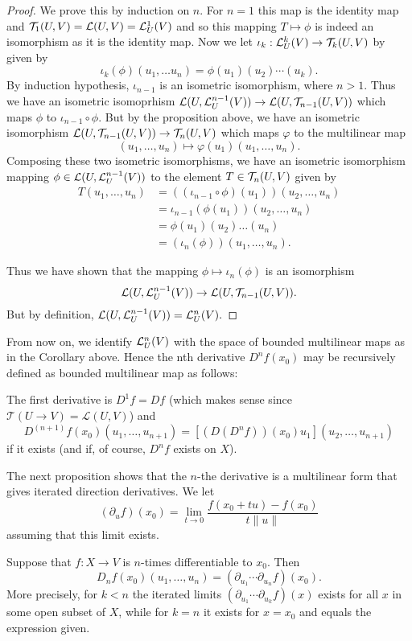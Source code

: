 \documentclass[twoside, a4paper, 10pt]{amsart}
\begin{document}
\begin{proof} We prove this by induction on $n$. For $n=1$ this map is the identity map and $\mathcal{T}_1(U,V) = \mathcal{L}(U,V) = \mathcal{L}^1_U(V)$ and so this mapping $T \mapsto \phi$ is indeed an isomorphism as it is the identity map. Now we let $\iota_k:\mathcal{L}^k_U(V) \to \mathcal{T}_k(U,V)$ by given by $$\iota_k(\phi)(u_1, \ldots u_n) = \phi(u_1)(u_2) \cdots (u_k).$$ By induction hypothesis, $\iota_{n-1}$ is an isometric isomorphism, where $n>1$.  Thus we have an isometric isomoprhism $\mathcal{L}(U, \mathcal{L}^{n-1}_U(V)) \to \mathcal{L}(U, \mathcal{T}_{n-1}(U,V))$ which maps $\phi$ to $\iota_{n-1} \circ \phi$. But by the proposition above, we have an isometric isomorphism $\mathcal{L}(U, \mathcal{T}_{n-1}(U,V)) \to \mathcal{T}_{n}(U,V)$ which maps $\varphi$ to the multilinear map $$(u_1, \ldots, u_n) \mapsto \varphi(u_1)(u_1, \ldots, u_n).$$ Composing these two isometric isomorphisms, we have an isometric isomorphism mapping $\phi \in \mathcal{L}(U, \mathcal{L}^{n-1}_U(V))$ to the element $T \in \mathcal{T}_{n}(U,V)$ given by 
\begin{align*} T(u_1, \ldots, u_n) &= ((\iota_{n-1} \circ \phi)(u_1))(u_2, \ldots, u_n) \\ 
&= \iota_{n-1}(\phi(u_1))(u_2, \ldots, u_n) \\
&= \phi(u_1)(u_2) \ldots (u_n) \\
& = (\iota_n(\phi))(u_1, \ldots, u_n).
 \end{align*}

Thus we have shown that the mapping $\phi \mapsto \iota_n(\phi)$ is an isomorphism $$\mathcal{L}(U, \mathcal{L}^{n-1}_U(V)) \to \mathcal{L}(U, \mathcal{T}_{n-1}(U,V)).$$ But by definition, $\mathcal{L}(U, \mathcal{L}^{n-1}_U(V)) = \mathcal{L}^{n}_U(V).$  \end{proof}

From now on, we identify $\mathcal{L}^n_U(V)$ with the space of bounded multilinear maps as in the Corollary above. 
Hence the nth derivative $D^nf(x_0)$ may be recursively defined as bounded multilinear map as follows:

 The first derivative is $D^1f = Df$ (which makes sense since $\mathcal{T}(U \to V) = \mathcal{L}(U, V)$) and $$D^{(n+1)}f (x_0)(u_1, \ldots, u_{n+1}) = [(D(D^nf))(x_0)u_1] (u_2, \ldots, u_{n+1})$$ if it exists (and if, of course, $D^nf$ exists on $X$). 

The next proposition shows that the $n$-the derivative is a multilinear form that gives iterated direction derivatives. We let $$(\partial_{u}f)(x_0) = \lim_{t \to 0} \frac{f(x_0+tu) - f(x_0)}{t \|u \|} $$ assuming that this limit exists.

\begin{prop} Suppose that $f:X \to V$ is $n$-times differentiable to $x_0$. Then $$D_n f (x_0)(u_1, \ldots, u_n) = (\partial_{u_1} \cdots \partial_{u_n} f) (x_0).$$ More precisely, for $k<n$ the iterated limits $(\partial_{u_1} \cdots \partial_{u_k}f) (x)$ exists for all $x$ in some open subset of $X$, while for $k=n$ it exists for $x=x_0$ and equals the expression given.

\end{prop}
\end{document}
